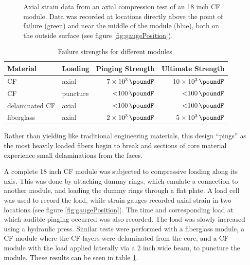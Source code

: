 \documentclass{aiaa-tc}%
\begin{document}
\begin{figure}[t]
{		\caption{
			Positioning of the strain gauges referred to in figure \ref{fig:strain}. 
			The gauges have been circled with colors corresponding to figure \ref{fig:strain}.
			Both are aligned with one of the pillars shown in figures \ref{fig:module} and \ref{fig:crush}.
			The bottom gauge is positioned directly above the point of failure.
			}
		\label{fig:gaugePosition}
	}
	\hfill
	\parbox{0.6\linewidth}
	{
		\centering
		
		\caption{
			Axial strain data from an axial compression test of an 18 inch CF module. 
			Data was recorded at locations directly above the point of failure (green) 
			and near the middle of the module (blue), both on the outside surface (see figure \ref{fig:gaugePosition}).
			}
		\label{fig:strain}
	}
\end{figure}

\begin{table}
	\centering
	\caption{Failure strengths for different modules.}
	\label{tab:compression}
	\begin{tabular}{llrr}
		Material & Loading & Pinging Strength & Ultimate Strength\\
		\hline
		CF 		& axial 	& $\SI{7e3}{\poundF}$ 	& $\SI{10e3}{\poundF}$ \\
		CF 		& puncture 	& $\SI{<100}{\poundF}$	& $\SI{<100}{\poundF}$\\
		delaminated CF 	& axial 	& $\SI{<100}{\poundF}$	& $\SI{<100}{\poundF}$\\
		fiberglass 	& axial 	& $\SI{2e3}{\poundF}$ 	& $\SI{5e3}{\poundF}$ \\
	\end{tabular}
\end{table}

Rather than yielding like traditional engineering materials, this design ``pings'' as the most heavily loaded fibers begin to break and sections of core material experience small delaminations from the faces. 

A complete 18 inch CF module was subjected to compressive loading along its axis. This was done by attaching dummy rings, which emulate a connection to another module, and loading the dummy rings through a flat plate. 
A load cell was used to record the load, while strain gauges recorded axial strain in two locations (see figure \ref{fig:gaugePosition}). 
The time and corresponding load at which audible pinging occurred was also recorded.
The load was slowly increased using a hydraulic press. 
Similar tests were performed with a fiberglass module, a CF module where the CF layers were delaminated from the core, and a CF module with the load applied laterally via a 2 inch wide beam, to puncture the module.
These results can be seen in table \ref{tab:compression}.
\end{document}
